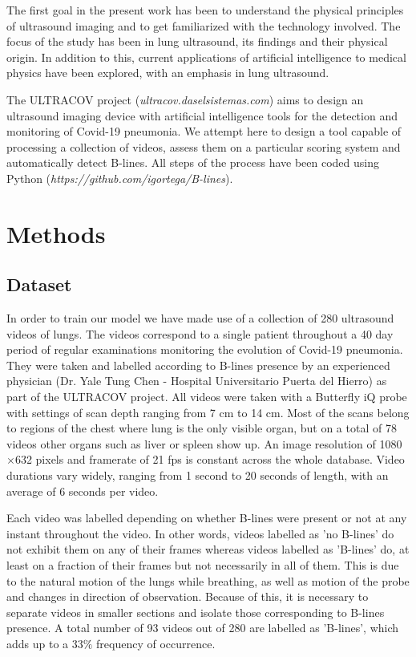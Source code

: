 \documentclass[12pt]{article} %
\begin{document}
	The first goal in the present work has been to understand the physical principles of ultrasound imaging and to get familiarized with the technology involved. The focus of the study has been in lung ultrasound, its findings and their physical origin. In addition to this, current applications of artificial intelligence to medical physics have been explored, with an emphasis in lung ultrasound. 
	
	The ULTRACOV project (\textsl{ultracov.daselsistemas.com}) aims to design an ultrasound imaging device with artificial intelligence tools for the detection and monitoring of Covid-19 pneumonia. We attempt here to design a tool capable of processing a collection of videos, assess them on a particular scoring system and automatically detect B-lines. All steps of the process have been coded using Python (\textsl{https://github.com/igortega/B-lines}).
	
\section{Methods}

\subsection{Dataset}

	In order to train our model we have made use of a collection of 280 ultrasound videos of lungs. The videos correspond to a single patient throughout a 40 day period of regular examinations monitoring the evolution of Covid-19 pneumonia. They were taken and labelled according to B-lines presence by an experienced physician (Dr. Yale Tung Chen - Hospital Universitario Puerta del Hierro) as part of the ULTRACOV project. All videos were taken with a Butterfly iQ probe with settings of scan depth ranging from 7 cm to 14 cm. Most of the scans belong to regions of the chest where lung is the only visible organ, but on a total of 78 videos other organs such as liver or spleen show up. An image resolution of 1080$\times$632 pixels and framerate of 21 fps is constant across the whole database. Video durations vary widely, ranging from 1 second to 20 seconds of length, with an average of 6 seconds per video. 
	
	Each video was labelled depending on whether B-lines were present or not at any instant throughout the video. In other words, videos labelled as 'no B-lines' do not exhibit them on any of their frames whereas videos labelled as 'B-lines' do, at least on a fraction of their frames but not necessarily in all of them. This is due to the natural motion of the lungs while breathing, as well as motion of the probe and changes in direction of observation. Because of this, it is necessary to  separate videos in smaller sections and isolate those corresponding to B-lines presence. A total number of 93 videos out of 280 are labelled as 'B-lines', which adds up to a $33 \%$ frequency of occurrence. 
	
\end{document}
